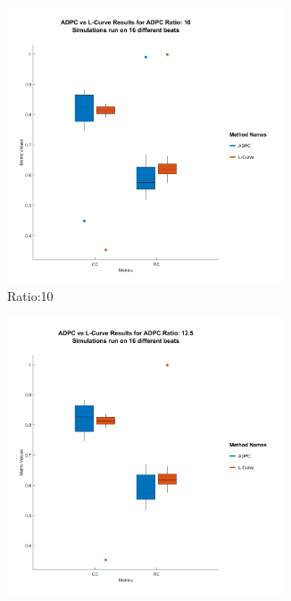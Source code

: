 \documentclass[draftcls, onecolumn, journal]{IEEEtran}
\begin{document}
\begin{figure}[h]
    \centering
    \begin{subfigure}[b]{0.48\textwidth}
    \centering
    \includegraphics[width=0.9\textwidth]{../images/ADPC_vs_L-Curve_Results_for_ADPC_Ratio_10.png}
    \caption{Ratio:10}\label{subfig:a}
    \end{subfigure}
    \begin{subfigure}[b]{0.48\linewidth}
    \centering
    \includegraphics[width=0.9\textwidth]{../images/ADPC_vs_L-Curve_Results_for_ADPC_Ratio_12_5.png}

\end{subfigure}
\end{figure}
\end{document}
